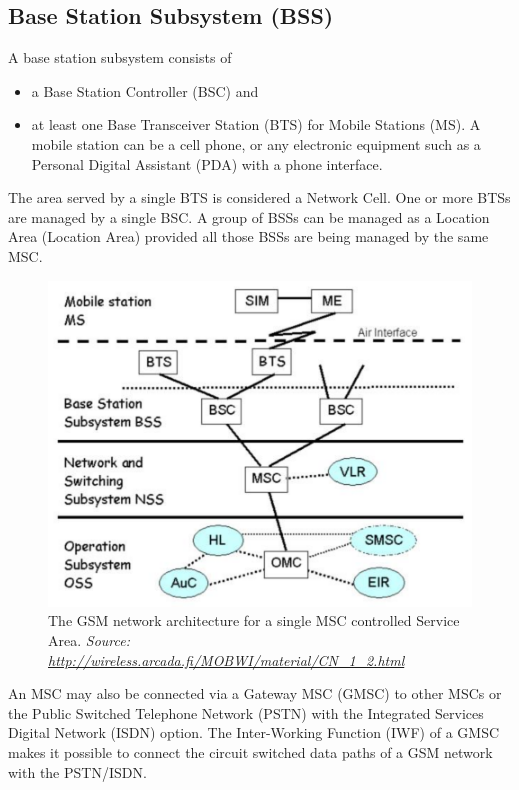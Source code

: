 \subsection{Base Station Subsystem (BSS)}

A base station subsystem consists of
\begin{itemize} 
\item a Base Station Controller (BSC) and
\item at least one Base Transceiver Station (BTS) for Mobile Stations (MS). A mobile station can be a cell phone, or any electronic equipment such as a Personal Digital Assistant (PDA) with a phone interface.
\end{itemize}

The area served by a single BTS is considered a Network Cell. One or more BTSs are managed by a single BSC.  A group of BSSs can be managed as a Location Area (Location Area) provided all those BSSs are being managed by the same MSC.


\begin{figure}
\centering
\includegraphics[scale=0.7]{archMSCServiceArea}
\caption[Network architecture for a single MSC Service Area]{The GSM network architecture for a single MSC controlled Service Area.
\emph{Source: \url{http://wireless.arcada.fi/MOBWI/material/CN\_1\_2.html}}}
\end{figure}


An MSC may also be connected via a Gateway MSC (GMSC) to other MSCs or the Public Switched Telephone Network (PSTN) with the Integrated Services Digital Network (ISDN) option. The Inter-Working Function (IWF) of a GMSC makes it possible to connect the circuit switched data paths of a GSM network with the PSTN/ISDN.

